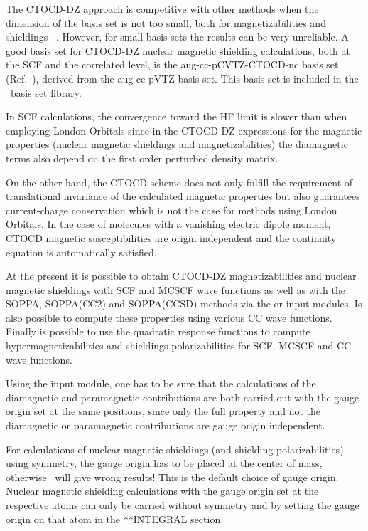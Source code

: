 The CTOCD-DZ approach is competitive with other methods when the dimension
of the basis set is not too small, both for magnetizabilities and
shieldings ~\cite{ctocd}. However, for small basis sets the results can be
very unreliable. A good basis set for CTOCD-DZ nuclear magnetic shielding
calculations, both at the SCF and the correlated level, is the aug-cc-pCVTZ-CTOCD-uc
basis set (Ref.~\cite{ctocd}), derived from the aug-cc-pVTZ basis set.
This basis set is included in the \dalton\ basis set library.

In SCF calculations, the convergence toward the HF limit is slower
than when employing London Orbitals since in the CTOCD-DZ expressions for
the magnetic properties (nuclear magnetic shieldings and magnetizabilities)
the diamagnetic terms also depend on the first order perturbed density matrix.

On the other hand, the CTOCD scheme does not only fulfill the requirement of
translational invariance of the calculated magnetic properties but also
guarantees current-charge conservation which is not the case for methods using
London Orbitals. In the case of molecules with a vanishing electric dipole
moment, CTOCD magnetic susceptibilities are origin independent and the
continuity equation is automatically satisfied.

At the present it is possible to obtain CTOCD-DZ magnetizabilities and
nuclear magnetic shieldings with SCF and MCSCF wave functions as well
as with the SOPPA, SOPPA(CC2) and SOPPA(CCSD) methods via the
 or  input modules. Is also possible to
compute these properties using various CC wave functions. Finally is
possible to use the quadratic response functions to compute
hypermagnetizabilities and shieldings polarizabilities for SCF, MCSCF
and CC wave functions.

Using the  input module, one has to be sure that the
calculations of the diamagnetic and paramagnetic contributions are both
carried out with the gauge origin set at the same positions, since only
the full property and not the diamagnetic or paramagnetic contributions
are gauge origin independent.

For calculations of nuclear magnetic shieldings (and shielding
polarizabilities) using symmetry, the gauge origin has to be placed at the
center of mass, otherwise \dalton\ will give wrong results! This is the
default choice of gauge origin. Nuclear magnetic
shielding calculations with the gauge origin set at the respective atoms can
only be carried without symmetry and by setting the gauge origin on that atom
in the **INTEGRAL section.

